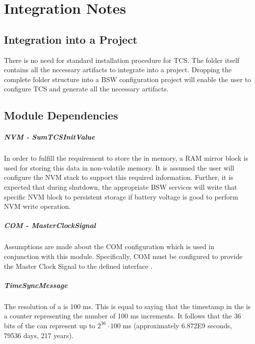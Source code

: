 \chapter{Integration Notes}

\section{Integration into a Project}
There is no need for standard installation procedure for TCS. The folder itself contains all the necessary
artifacts to integrate into a project. Dropping the complete folder structure into a BSW configuration
project will enable the user to configure TCS and generate all the necessary artifacts.

\section{Module Dependencies}

\paragraph{NVM - SumTCSInitValue}
In order to fulfill the requirement to store the  in memory, a RAM mirror block is used for storing this data in non-volatile memory.
It is assumed the user will configure the NVM stack to support this required information.
Further, it is expected that during shutdown, the appropriate BSW services will write that specific NVM block to persistent storage if battery voltage is good to perform NVM write operation.

\paragraph{COM - MasterClockSignal}
Assumptions are made about the COM configuration which is used in conjunction with this module.
Specifically, COM must be configured to provide the Master Clock Signal to the defined \LongName interface .

\paragraph{TimeSyncMessage}
The resolution of a  is 100 ms.
This is equal to saying that the timestamp in the  is a counter representing the number of 100 ms increments.
It follows that the 36 bits of the  can represent up to $2^{36} \cdot 100$ ms (approximately 6.872E9 seconds, 79536 days, 217 years).

